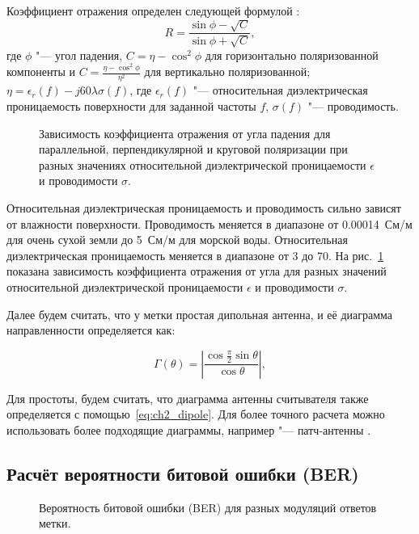 Коэффициент отражения определен следующей формулой \cite{Gonzalez2013}:
$$
  R = \frac{\sin\phi - \sqrt{C}}{\sin\phi + \sqrt{C}},
$$
где $\phi$ "--- угол падения, $C = \eta - \cos^2\phi$ для горизонтально поляризованной компоненты и $C = \frac{\eta - \cos^2\phi}{\eta^2}$ для вертикально поляризованной; $\eta = \epsilon_r(f)-j60\lambda\sigma(f)$, где $\epsilon_r(f)$ "--- относительная диэлектрическая проницаемость поверхности для заданной частоты $f$, $\sigma(f)$ "--- проводимость.

\begin{figure}[!t]
	\caption{Зависимость коэффициента отражения от угла падения для параллельной, перпендикулярной и круговой поляризации при разных значениях относительной диэлектрической проницаемости $\epsilon$ и проводимости $\sigma$.}
	\label{fig:ch2_reflection}
\end{figure}

Относительная диэлектрическая проницаемость и проводимость сильно зависят от влажности поверхности. Проводимость меняется в диапазоне от 0.00014~См/м для очень сухой земли до 5~См/м для морской воды. Относительная диэлектрическая проницаемость меняется в диапазоне от 3 до 70. На рис.~\ref{fig:ch2_reflection} показана зависимость коэффициента отражения от угла для разных значений относительной диэлектрической проницаемости $\epsilon$ и проводимости $\sigma$.

Далее будем считать, что у метки простая дипольная антенна, и её диаграмма направленности определяется как:

\begin{equation}\label{eq:ch2_dipole}
	\Gamma(\theta) = \left| 
		\frac{\cos{\frac{\pi}{2}\sin{\theta}}}{\cos{\theta}} \right|,
\end{equation}

Для простоты, будем считать, что диаграмма антенны считывателя также определяется с помощью~\eqref{eq:ch2_dipole}. Для более точного расчета можно использовать более подходящие диаграммы, например "--- патч-антенны \cite{Balanis2016}.




\subsection{Расчёт вероятности битовой ошибки (BER)}
\begin{figure}[!t]
	\caption{Вероятность битовой ошибки (BER) для разных модуляций ответов метки.}
	\label{fig:ch2_ber_miller}
\end{figure}

